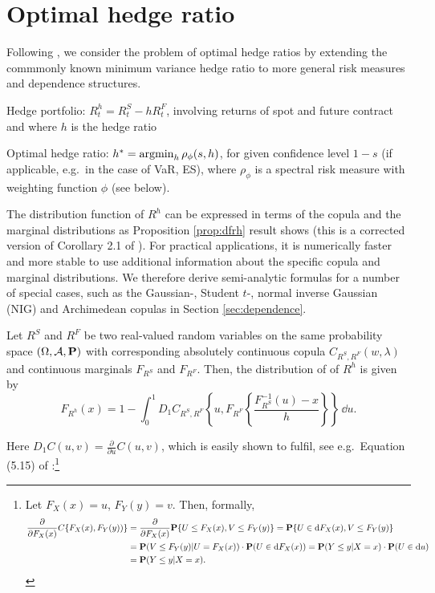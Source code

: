 \section{Optimal hedge ratio}
\label{sec:optimal-hedge-ratio}

Following \citep{barbi2014copula}, we consider the problem of optimal
hedge ratios by extending the commmonly known minimum variance hedge
ratio to more general risk measures and dependence
structures.\medskip

Hedge portfolio: $R_t^h = R_t^S - h R_t^F$, involving returns of spot
and future contract and where $h$ is the hedge ratio

Optimal hedge ratio: $h^\ast = \argmin_h \rho_\phi(s,h)$, for given
confidence level $1-s$ (if applicable, e.g.\ in the case of VaR, ES),
where $\rho_\phi$ is a spectral risk measure with weighting function
$\phi$ (see below).

The distribution function of $R^h$ can be expressed in terms of the
copula and the marginal distributions as Proposition \ref{prop:dfrh}
result shows (this is a corrected version of Corollary 2.1 of
\citep{barbi2014copula}). For practical applications, it is numerically
faster and more stable to use additional information about the
specific copula and marginal distributions. We therefore derive
semi-analytic formulas for a number of special cases, such as the
Gaussian-, Student $t$-, normal inverse Gaussian (NIG) and Archimedean
copulas in Section \ref{sec:dependence}.

\begin{proposition}
  \label{prop:dfrh}
  Let $R^S$ and $R^F$ be two real-valued random variables on the same
  probability space $(\Omega, \mathcal A, {\bf P})$ with corresponding
  absolutely continuous copula $C_{R^S, R^F}(w,\lambda)$ and
  continuous marginals $F_{R^S}$ and $F_{R^F}$. Then, the distribution
  of of $R^h$ is given by
  \begin{equation}
    \label{eq:3}
    F_{R^h}(x) = 1- \int^1_0 D_1 C_{R^S, R^F}
    \left\{ u, F_{R^F} \left\{ \frac{F^{-1}_{R^S}(u)-x}{h} \right\}
    \right\}\, \dd u.
  \end{equation}
\end{proposition}
Here $D_1 C(u,v)=\displaystyle \frac{\partial}{\partial u} C(u,v)$,
which is easily shown to fulfil, see e.g.\ Equation (5.15) of
\citep{McNeil2005}:\footnote{%
  Let $F_X(x)=u$, $F_Y(y)=v$. Then, formally,
  \begin{align*}
    \frac{\partial}{\partial F_X(x)} C\{F_X(x), F_Y(y))\}%
    &= \frac{\partial}{\partial F_X(x)} \p\{U\leq F_X(x),
      V\leq F_Y(y)\} %
      = \p\{U\in \dd F_X(x), V\leq F_Y(y)\}\\ %
    &= \p(V\leq F_Y(y)| U = F_X(x))\cdot \p(U \in \dd
      F_X(x)) %
      = \p(Y\leq y|X=x)\cdot \p(U\in \dd u)\\ %
    &= \p(Y\leq y|X=x).
  \end{align*}}

